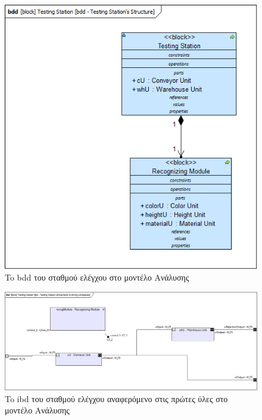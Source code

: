 \documentclass[a4paper,12pt,twoside]{report}
\begin{document}
{\begin{appendices}
			\begin{figure}[hp]
					\centering
					\includegraphics[scale=0.30]{AnalysisModel_bdd-TestingStationsStructure.png}
					\caption{To bdd του σταθμού ελέγχου στο μοντέλο Ανάλυσης}
					\label{φωτ:To bdd του σταθμού ελέγχου Festo Mps στο μοντέλο Ανάλυσης}
			\end{figure}
			
			\begin{figure}[hp]
					\centering
					\includegraphics[scale=0.30]{AnalysisModel_ibd-TestingStationconnectionsinvolvingworkpieces.png}
					\caption{To ibd του σταθμού ελέγχου αναφερόμενο στις πρώτες ύλες στο μοντέλο Ανάλυσης}
					\label{φωτ:To ibd του σταθμού ελέγχου αναφερόμενο στις πρώτες ύλες στο μοντέλο Ανάλυσης}
			\end{figure}
			

\end{appendices}}
\end{document}
